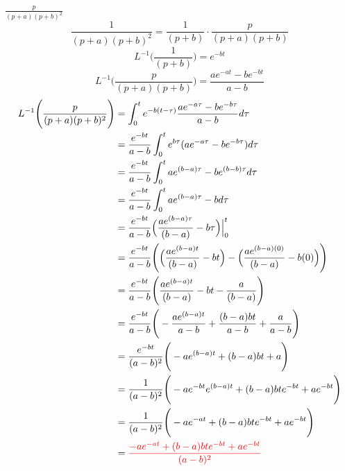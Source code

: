 \item[5.]$\frac{p}{(p+a)(p+b)^2}$
\[
    \frac{1}{(p+a)(p+b)^2} = \frac{1}{(p+b)}\cdot\frac{p}{(p+a)(p+b)}
\]
\begin{equation*}
    L^{-1}\Bigg(\frac{1}{(p+b)}\Bigg) 
    = e^{-bt}
    \tag{By \( L2 \)}
\end{equation*}
\begin{equation*}
    L^{-1}\Bigg(\frac{p}{(p+a)(p+b)}\Bigg) 
    = \frac{ae^{-at}-be^{-bt}}{a-b}
    \tag{By \( L8 \)}
\end{equation*}
\begin{align*}
    L^{-1}\Bigg( \frac{p}{(p+a)(p+b)^2} \Bigg)
    & = \int_0^t e^{-b(t-\tau)} \frac{ae^{-a\tau}-be^{-b\tau}}{a-b}d\tau \\
    & = \frac{e^{-bt}}{a-b}\int_0^te^{b\tau} (ae^{-a\tau}-be^{-b\tau})d\tau\\
    & = \frac{e^{-bt}}{a-b}\int_0^t ae^{(b-a)\tau}-be^{(b-b)\tau}d\tau\\
    & = \frac{e^{-bt}}{a-b}\int_0^t ae^{(b-a)\tau}-bd\tau\\
    & = \frac{e^{-bt}}{a-b}\Big( \frac{ae^{(b-a)\tau}}{(b-a)}-b\tau\Big)\Big|_0^t\\
    & = \frac{e^{-bt}}{a-b}\Bigg( 
    \Big(\frac{ae^{(b-a)t}}{(b-a)}-bt\Big)
    -\Big(\frac{ae^{(b-a)(0)}}{(b-a)}-b(0)\Big)
    \Bigg)\\
    & = \frac{e^{-bt}}{a-b}\Bigg( 
    \frac{ae^{(b-a)t}}{(b-a)}-bt
    -\frac{a}{(b-a)}
    \Bigg)\\
    & = \frac{e^{-bt}}{a-b}\Bigg( 
    -\frac{ae^{(b-a)t}}{a-b}+\frac{(b-a)bt}{a-b}
    +\frac{a}{a-b}
    \Bigg)\\
    & = \frac{e^{-bt}}{(a-b)^2}\Bigg( 
    -ae^{(b-a)t}+(b-a)bt
    +a
    \Bigg)\\
    & = \frac{1}{(a-b)^2}\Bigg( 
    -ae^{-bt}e^{(b-a)t}+(b-a)bte^{-bt}
    +ae^{-bt}
    \Bigg)\\
    & = \frac{1}{(a-b)^2}\Bigg( 
    -ae^{-at}+(b-a)bte^{-bt}
    +ae^{-bt}
    \Bigg)\\
    & = \textcolor{red}{\frac{-ae^{-at}+(b-a)bte^{-bt}
    +ae^{-bt}}{(a-b)^2}}
\end{align*}